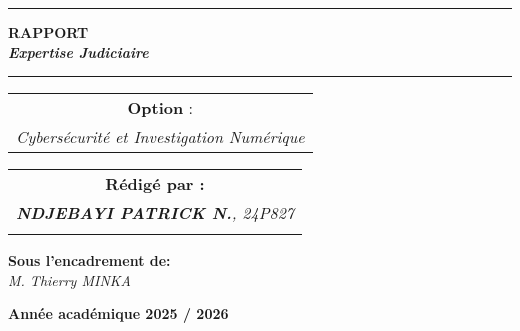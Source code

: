 \documentclass[12pt,a4paper]{article}
\begin{document}
\begin{titlepage}
\begin{center}
		\vspace{0.5cm}
		\begin{tabular}{l*{40}{@{\hskip 3.5cm}c@{\hskip5cm}} p{3.5cm} r}
		\end{tabular}
		
		\noindent\rule{\textwidth}{0.7mm}
		\Large{{\textbf{RAPPORT}}}\\
		\Large{{\textbf{\textit{Expertise Judiciaire}}}}
		\noindent\rule{\textwidth}{0.7mm}
	\end{center}
		
	\begin{center}
	\begin{tabular}{c}
		
		\vspace{0.1cm}
		\normalsize
	
	
		\vspace{0.1cm}
		\normalsize\textbf{Option }:\\			
		\textsl{Cybersécurité et Investigation Numérique}
		
	\end{tabular}
	\end{center}
		
	\begin{center}
		\normalsize %
		\begin{tabular}{c}
			\vspace{0.07cm}
			\hspace{0.02cm} \textbf{\textbf{Rédigé par :}}\\
			
			\hspace{0.02cm} \textsl{\textbf{NDJEBAYI PATRICK N.}, 24P827}\\\\
			
			
		\end{tabular}
	\end{center}
	
	\begin{center}
	\hspace{0.02cm} \textbf{Sous l'encadrement de:}\\
	\hspace{0.02cm} \textsl{M. Thierry MINKA}
	\end{center}
	
    
	\vspace{2cm}
	\begin{center}
		\textbf{Année académique 2025 / 2026}
	\end{center}
				
	\vfill%
	
\end{titlepage}
\end{document}
